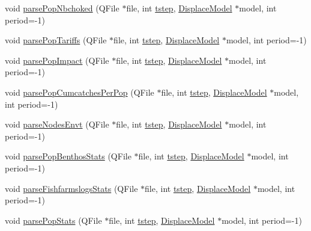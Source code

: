 \begin{DoxyCompactItemize}
\item 
void \mbox{\hyperlink{class_output_file_parser_a749b7d83ea62ef019421334a4a75c4cd}{parse\+Pop\+Nbchoked}} (Q\+File $\ast$file, int \mbox{\hyperlink{thread__vessels_8cpp_a84bc73d278de929ec9974e1a95d9b23a}{tstep}}, \mbox{\hyperlink{class_displace_model}{Displace\+Model}} $\ast$model, int period=-\/1)
\item 
void \mbox{\hyperlink{class_output_file_parser_a53430b2faed0d1421652de52b07ead9c}{parse\+Pop\+Tariffs}} (Q\+File $\ast$file, int \mbox{\hyperlink{thread__vessels_8cpp_a84bc73d278de929ec9974e1a95d9b23a}{tstep}}, \mbox{\hyperlink{class_displace_model}{Displace\+Model}} $\ast$model, int period=-\/1)
\item 
void \mbox{\hyperlink{class_output_file_parser_a88776b1c3cc91e079131e1dbb5fd76e4}{parse\+Pop\+Impact}} (Q\+File $\ast$file, int \mbox{\hyperlink{thread__vessels_8cpp_a84bc73d278de929ec9974e1a95d9b23a}{tstep}}, \mbox{\hyperlink{class_displace_model}{Displace\+Model}} $\ast$model, int period=-\/1)
\item 
void \mbox{\hyperlink{class_output_file_parser_a76118b94b1cf3428eb8babfc448a8416}{parse\+Pop\+Cumcatches\+Per\+Pop}} (Q\+File $\ast$file, int \mbox{\hyperlink{thread__vessels_8cpp_a84bc73d278de929ec9974e1a95d9b23a}{tstep}}, \mbox{\hyperlink{class_displace_model}{Displace\+Model}} $\ast$model, int period=-\/1)
\item 
void \mbox{\hyperlink{class_output_file_parser_afb121d3802efa9a93e22f92cb4083a9e}{parse\+Nodes\+Envt}} (Q\+File $\ast$file, int \mbox{\hyperlink{thread__vessels_8cpp_a84bc73d278de929ec9974e1a95d9b23a}{tstep}}, \mbox{\hyperlink{class_displace_model}{Displace\+Model}} $\ast$model, int period=-\/1)
\item 
void \mbox{\hyperlink{class_output_file_parser_aea1d5e3b57e0ac131e9c761242ea572f}{parse\+Pop\+Benthos\+Stats}} (Q\+File $\ast$file, int \mbox{\hyperlink{thread__vessels_8cpp_a84bc73d278de929ec9974e1a95d9b23a}{tstep}}, \mbox{\hyperlink{class_displace_model}{Displace\+Model}} $\ast$model, int period=-\/1)
\item 
void \mbox{\hyperlink{class_output_file_parser_a08ca9be64963f89acfa897aff9e9eaf3}{parse\+Fishfarmslogs\+Stats}} (Q\+File $\ast$file, int \mbox{\hyperlink{thread__vessels_8cpp_a84bc73d278de929ec9974e1a95d9b23a}{tstep}}, \mbox{\hyperlink{class_displace_model}{Displace\+Model}} $\ast$model, int period=-\/1)
\item 
void \mbox{\hyperlink{class_output_file_parser_acf5d73a5c6368aa20d131ecc4e347191}{parse\+Pop\+Stats}} (Q\+File $\ast$file, int \mbox{\hyperlink{thread__vessels_8cpp_a84bc73d278de929ec9974e1a95d9b23a}{tstep}}, \mbox{\hyperlink{class_displace_model}{Displace\+Model}} $\ast$model, int period=-\/1)

\end{DoxyCompactItemize}
